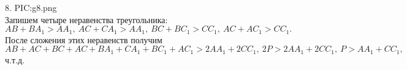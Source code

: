 8. {{PIC:g8.png}}\\
Запишем четыре неравенства треугольника: $AB+BA_1>AA_1,\ AC+CA_1>AA_1,\ BC+BC_1>CC_1,\ AC+AC_1>CC_1.$ После сложения этих неравенств получим
$AB+AC+BC+AC+BA_1+CA_1+BC_1+AC_1>2AA_1+2CC_1,\ 2P>2AA_1+2CC_1,\ P>AA_1+CC_1,$ ч.т.д.\\
